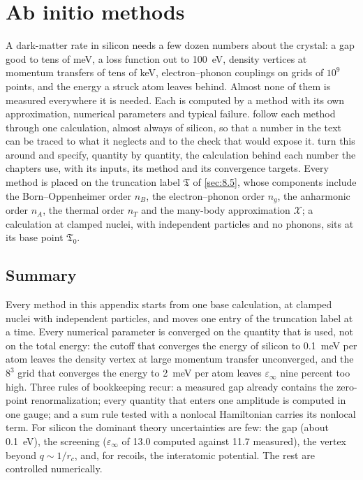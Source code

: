 \chapter{Ab initio methods}\label{app:E}

A dark-matter rate in silicon needs a few dozen numbers about the crystal: a gap good to tens of meV, a loss function out to \SI{100}{eV}, density vertices at momentum transfers of tens of keV, electron--phonon couplings on grids of $10^9$ points, and the energy a struck atom leaves behind. Almost none of them is measured everywhere it is needed. Each is computed by a method with its own approximation, numerical parameters and typical failure.  follow each method through one calculation, almost always of silicon, so that a number in the text can be traced to what it neglects and to the check that would expose it.  turn this around and specify, quantity by quantity, the calculation behind each number the chapters use, with its inputs, its method and its convergence targets. Every method is placed on the truncation label $\mathfrak{T}$ of \cref{sec:8.5}, whose components include the Born--Oppenheimer order $n_B$, the electron--phonon order $n_g$, the anharmonic order $n_A$, the thermal order $n_T$ and the many-body approximation $\mathcal{X}$; a calculation at clamped nuclei, with independent particles and no phonons, sits at its base point $\mathfrak{T}_0$.















\section*{Summary}

Every method in this appendix starts from one base calculation, at clamped nuclei with independent particles, and moves one entry of the truncation label at a time. Every numerical parameter is converged on the quantity that is used, not on the total energy: the cutoff that converges the energy of silicon to \SI{0.1}{meV} per atom leaves the density vertex at large momentum transfer unconverged, and the $8^3$ grid that converges the energy to \SI{2}{meV} per atom leaves $\varepsilon_\infty$ nine percent too high. Three rules of bookkeeping recur: a measured gap already contains the zero-point renormalization; every quantity that enters one amplitude is computed in one gauge; and a sum rule tested with a nonlocal Hamiltonian carries its nonlocal term. For silicon the dominant theory uncertainties are few: the gap (about \SI{0.1}{eV}), the screening ($\varepsilon_\infty$ of 13.0 computed against 11.7 measured), the vertex beyond $q \sim 1/r_c$, and, for recoils, the interatomic potential. The rest are controlled numerically.

\printbibliography[heading=subbibliography]
